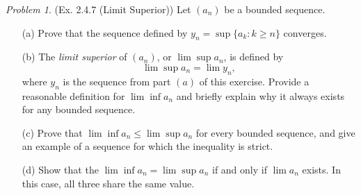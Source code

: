 \documentclass[11pt,twoside, reqno]{amsart}
\theoremstyle{remark}
\newtheorem{Prob}{Problem}
\begin{document}
\begin{Prob}(Ex. 2.4.7 (Limit Superior)) Let $(a_n)$ be a bounded sequence.
\begin{enumerate}
    \item [(a)] Prove that the sequence defined by $y_n = \sup \{a_k : k \geq n\}$ converges.
    \item [(b)] The \textit{limit superior} of $(a_n)$, or $\lim \sup a_n$, is defined by
    $$
        \lim \sup a_n = \lim y_n,
    $$
    where $y_n$ is the sequence from part $(a)$ of this exercise. Provide a reasonable definition for $\lim \inf a_n$ and briefly explain why it always exists for any bounded sequence.
    \item [(c)] Prove that $\lim \inf a_n \leq \lim \sup a_n$ for every bounded sequence, and give an example of a sequence for which the inequality is strict.
    \item [(d)] Show that the $\lim \inf a_n = \lim \sup a_n$ if and only if $\lim a_n$ exists. In this case, all three share the same value.
\end{enumerate}
\end{Prob}
\end{document}
